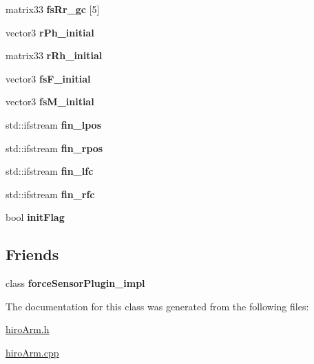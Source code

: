 \begin{DoxyCompactItemize}
\item 
\hypertarget{classhiroArm_a0e69681e3882555cc18ae8bd6191e535}{matrix33 {\bfseries fs\-Rr\-\_\-gc} \mbox{[}5\mbox{]}}\label{classhiroArm_a0e69681e3882555cc18ae8bd6191e535}

\item 
\hypertarget{classhiroArm_aaf7d09fbdea5bfe0ba41eb31761b6aed}{vector3 {\bfseries r\-Ph\-\_\-initial}}\label{classhiroArm_aaf7d09fbdea5bfe0ba41eb31761b6aed}

\item 
\hypertarget{classhiroArm_ad8ebd1440896701a3a44dbd16b06e79d}{matrix33 {\bfseries r\-Rh\-\_\-initial}}\label{classhiroArm_ad8ebd1440896701a3a44dbd16b06e79d}

\item 
\hypertarget{classhiroArm_a1503923eddd3cc2bbb996b5d9ed306e5}{vector3 {\bfseries fs\-F\-\_\-initial}}\label{classhiroArm_a1503923eddd3cc2bbb996b5d9ed306e5}

\item 
\hypertarget{classhiroArm_a27db0eb1157726a75cc0c760dbb984c9}{vector3 {\bfseries fs\-M\-\_\-initial}}\label{classhiroArm_a27db0eb1157726a75cc0c760dbb984c9}

\item 
\hypertarget{classhiroArm_af1aded47966174202506f75d464dab51}{std\-::ifstream {\bfseries fin\-\_\-lpos}}\label{classhiroArm_af1aded47966174202506f75d464dab51}

\item 
\hypertarget{classhiroArm_a336342501e46c62ee5f2021c3f44835c}{std\-::ifstream {\bfseries fin\-\_\-rpos}}\label{classhiroArm_a336342501e46c62ee5f2021c3f44835c}

\item 
\hypertarget{classhiroArm_a4106db25c02c7ca50d66ea943ff7e9ab}{std\-::ifstream {\bfseries fin\-\_\-lfc}}\label{classhiroArm_a4106db25c02c7ca50d66ea943ff7e9ab}

\item 
\hypertarget{classhiroArm_a4cf03d39eb6faa765bcc58090ea5a604}{std\-::ifstream {\bfseries fin\-\_\-rfc}}\label{classhiroArm_a4cf03d39eb6faa765bcc58090ea5a604}

\item 
\hypertarget{classhiroArm_a38fffc28b35466feb50467dd49282f1a}{bool {\bfseries init\-Flag}}\label{classhiroArm_a38fffc28b35466feb50467dd49282f1a}

\end{DoxyCompactItemize}
\subsection*{Friends}
\begin{DoxyCompactItemize}
\item 
\hypertarget{classhiroArm_a05deaa370806bc767b12f2aef37c348a}{class {\bfseries force\-Sensor\-Plugin\-\_\-impl}}\label{classhiroArm_a05deaa370806bc767b12f2aef37c348a}

\end{DoxyCompactItemize}


The documentation for this class was generated from the following files\-:\begin{DoxyCompactItemize}
\item 
\hyperlink{hiroArm_8h}{hiro\-Arm.\-h}\item 
\hyperlink{hiroArm_8cpp}{hiro\-Arm.\-cpp}\end{DoxyCompactItemize}
